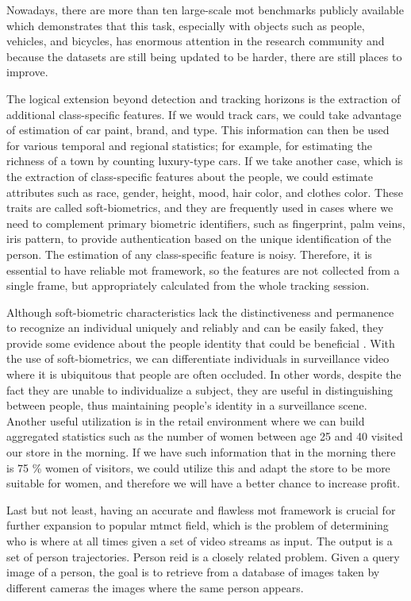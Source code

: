 \begin{introduction}
        Nowadays, there are more than ten large-scale \gls{mot} benchmarks publicly available which demonstrates that this task, especially with objects such as people, vehicles, and bicycles, has enormous attention in the research community and because the datasets are still being updated to be harder, there are still places to improve. 
        
        The logical extension beyond detection and tracking horizons is the extraction of additional class-specific features. If we would track cars, we could take advantage of estimation of car paint, brand, and type. This information can then be used for various temporal and regional statistics; for example, for estimating the richness of a town by counting luxury-type cars. If we take another case, which is the extraction of class-specific features about the people, we could estimate attributes such as race, gender, height, mood, hair color, and clothes color. These traits are called soft-biometrics, and they are frequently used in cases where we need to complement primary biometric identifiers, such as fingerprint, palm veins, iris pattern, to provide authentication based on the unique identification of the person. The estimation of any class-specific feature is noisy. Therefore, it is essential to have reliable \gls{mot} framework, so the features are not collected from a single frame, but appropriately calculated from the whole tracking session.
        
        Although soft-biometric characteristics lack the distinctiveness and permanence to recognize an individual uniquely and reliably and can be easily faked, they provide some evidence about the people identity that could be beneficial \cite{wiki:biometric}. With the use of soft-biometrics, we can differentiate individuals in surveillance video where it is ubiquitous that people are often occluded. In other words, despite the fact they are unable to individualize a subject, they are useful in distinguishing between people, thus maintaining people's identity in a surveillance scene. Another useful utilization is in the retail environment where we can build aggregated statistics such as the number of women between age 25 and 40 visited our store in the morning. If we have such information that in the morning there is 75 \% women of visitors, we could utilize this and adapt the store to be more suitable for women, and therefore we will have a better chance to increase profit.
        
        Last but not least, having an accurate and flawless \gls{mot} framework is crucial for further expansion to popular \gls{mtmct} field, which is the problem of determining who is where at all times given a set of video streams as input. The output is a set of person trajectories. Person \gls{reid} is a closely related problem. Given a query image of a person, the goal is to retrieve from a database of images taken by different cameras the images where the same person appears. \cite{ristani2016MTMC}
        

\end{introduction}
